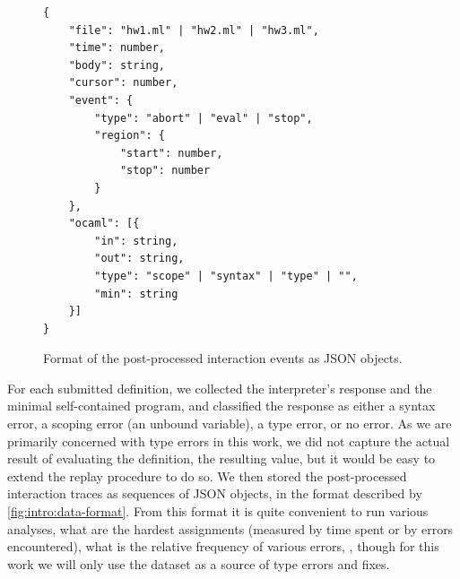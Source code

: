 \begin{figure}[t]
\centering
\small
\begin{lstlisting}
{
    "file": "hw1.ml" | "hw2.ml" | "hw3.ml",
    "time": number,
    "body": string,
    "cursor": number,
    "event": {
        "type": "abort" | "eval" | "stop",
        "region": {
            "start": number,
            "stop": number
        }
    },
    "ocaml": [{
        "in": string,
        "out": string,
        "type": "scope" | "syntax" | "type" | "",
        "min": string
    }]
}
\end{lstlisting}
\caption{Format of the post-processed interaction events as JSON
  objects.}
\label{fig:intro:data-format}
\end{figure}

For each submitted definition, we collected the interpreter's response
and the minimal self-contained program, and classified the response as
either a syntax error, a scoping error (\eg an unbound variable), a type
error, or no error.
%
As we are primarily concerned with type errors in this work, we did not
capture the actual result of evaluating the definition, \ie the
resulting value, but it would be easy to extend the replay procedure to
do so.
%
We then stored the post-processed interaction traces as sequences of
JSON objects, in the format described by
\autoref{fig:intro:data-format}.
%
From this format it is quite convenient to run various analyses, \eg
what are the hardest assignments (measured by time spent or by errors
encountered), what is the relative frequency of various errors, \etc,
though for this work we will only use the dataset as a source of type
errors and fixes.


